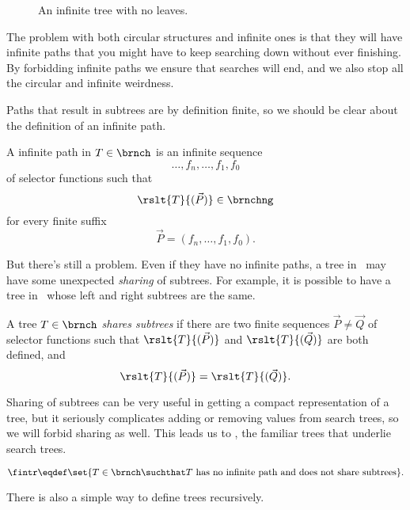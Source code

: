 \begin{definition}
\begin{figure}
\caption{An infinite tree with no leaves.}                            

\label{inftree123}                                                   

\end{figure}

The problem with both circular structures and infinite ones is that
they will have infinite paths that you might have to keep searching
down without ever finishing.  By forbidding infinite paths we ensure
that searches will end, and we also stop all the circular and infinite
weirdness.

Paths that result in subtrees are by definition finite, so we should
be clear about the definition of an infinite path.

\begin{definition}
A infinite path in $T \in \brnch$ is an infinite sequence
\[
\dots,f_n,\dots,f_1,f_0
\]
of selector functions such that
\[
\rslt{T}{(\vec{P})} \in \brnchng
\]
for every finite suffix
\[
\vec{P} = (f_n,\dots, f_1,f_0).
\]
\end{definition}

But there's still a problem.  Even if they
have no infinite paths, a tree in \brnch\ may have some unexpected
\emph{sharing} of subtrees.  For example, it is possible to have a
tree in \brnch\ whose left and right subtrees are the same.



\begin{definition}
A tree $T \in \brnch$ \emph{shares subtrees} if there are two finite
sequences $\vec{P} \neq \vec{Q}$ of selector functions such that
$\rslt{T}{(\vec{P})}$ and $\rslt{T}{(\vec{Q})}$ are both defined, and
\[
\rslt{T}{(\vec{P})}=\rslt{T}{(\vec{Q})}.
\]
\end{definition}
Sharing of subtrees can be very useful in getting a compact
representation of a tree, but it seriously complicates adding or
removing values from search trees, so we will forbid sharing as well.
This leads us to \fintr, the familiar trees that underlie search
trees.
\begin{definition}
\[
\fintr \eqdef \set{T \in \brnch \suchthat T\ \text{has no infinite path and
  does not share subtrees}}.
\]
\end{definition}

There is also a simple way to define trees recursively.


\end{definition}
